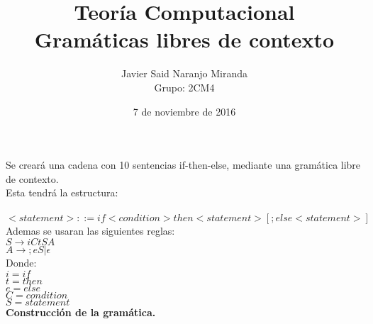 \documentclass[12pt,letterpaper]{article}
\author{Javier Said Naranjo Miranda\\ Grupo: 2CM4}
\title{Teor\'ia Computacional\\ Gram\'aticas libres de contexto}
\date{7 de noviembre de 2016}
\begin{document}
\maketitle
\justify
Se crear\'a una cadena con 10 sentencias if-then-else, mediante una gram\'atica libre de contexto.\\

Esta tendr\'a la estructura:\\ \\
$<statement>::=if<condition>then<statement>
[;else <statement>] $\\

Ademas se usaran las siguientes reglas:\\
$S \rightarrow iCtSA$\\
$A \rightarrow ;eS | \epsilon$\\
Donde: \\
$i=if$\\
$t=then$\\
$e=else$\\
$C=condition$\\
$S=statement$\\
\textbf{Construcci\'on de la gram\'atica.}\\
\end{document}
